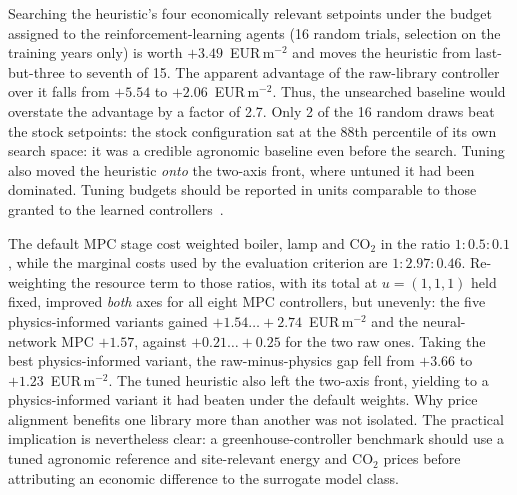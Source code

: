 Searching the heuristic's four economically relevant setpoints under the budget assigned
to the reinforcement-learning agents (16 random trials, selection on the training years only) is worth
$+3.49$~EUR\,m$^{-2}$ and moves the heuristic from last-but-three to seventh of
15. The apparent advantage of the raw-library controller over it falls
from $+5.54$ to $+2.06$~EUR\,m$^{-2}$. Thus, the unsearched baseline would overstate the
advantage by a factor of 2.7.
Only 2 of the 16 random draws beat the stock setpoints: the
stock configuration sat at the 88th percentile of its own search space: it was a credible
agronomic baseline even before the search. Tuning also moved the heuristic \emph{onto} the
two-axis front, where untuned it had been dominated.
Tuning budgets should be reported in units comparable to those granted to the
learned controllers~\cite{henderson2018}.

The default MPC stage cost weighted boiler, lamp and CO$_2$ in the ratio
$1:0.5:0.1$, while the marginal costs used by the evaluation criterion are
$1:2.97:0.46$. Re-weighting the resource term to those ratios, with its total at
$u=(1,1,1)$ held fixed,
improved \emph{both} axes for all eight MPC controllers, but unevenly: the five
physics-informed variants gained $+1.54\ldots+2.74$~EUR\,m$^{-2}$ and the
neural-network MPC $+1.57$, against $+0.21\ldots+0.25$ for the two raw ones.
Taking the best physics-informed variant, the raw-minus-physics gap fell from
$+3.66$ to $+1.23$~EUR\,m$^{-2}$. The tuned heuristic also left the two-axis front,
yielding to a physics-informed variant it had beaten under the default weights. Why price
alignment benefits one library more than another was not isolated. The practical
implication is nevertheless clear: a greenhouse-controller benchmark should use a tuned
agronomic reference and site-relevant energy and CO$_2$ prices before attributing an
economic difference to the surrogate model class.

